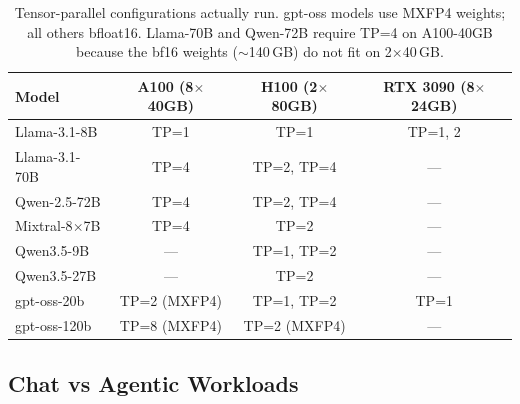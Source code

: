 \begin{table}[t]
\caption{Tensor-parallel configurations actually run. gpt-oss models use MXFP4 weights; all others bfloat16. Llama-70B and Qwen-72B require TP=4 on A100-40GB because the bf16 weights ($\sim$140\,GB) do not fit on 2$\times$40\,GB.}
\label{tab:tp_configs}
\centering
\small
\begin{tabular}{lccc}
\toprule
\textbf{Model} & \textbf{A100 (8$\times$40GB)} & \textbf{H100 (2$\times$80GB)} & \textbf{RTX 3090 (8$\times$24GB)} \\
\midrule
Llama-3.1-8B        & TP=1            & TP=1            & TP=1, 2 \\
Llama-3.1-70B       & TP=4            & TP=2, TP=4      & --- \\
Qwen-2.5-72B        & TP=4            & TP=2, TP=4      & --- \\
Mixtral-8$\times$7B & TP=4            & TP=2            & --- \\
Qwen3.5-9B          & ---              & TP=1, TP=2      & --- \\
Qwen3.5-27B         & ---              & TP=2            & --- \\
gpt-oss-20b         & TP=2 (MXFP4)    & TP=1, TP=2      & TP=1 \\
gpt-oss-120b        & TP=8 (MXFP4)    & TP=2 (MXFP4)    & --- \\
\bottomrule
\end{tabular}
\end{table}

\FloatBarrier


\subsection{Chat vs Agentic Workloads}
\label{sec:chat_vs_agentic}



